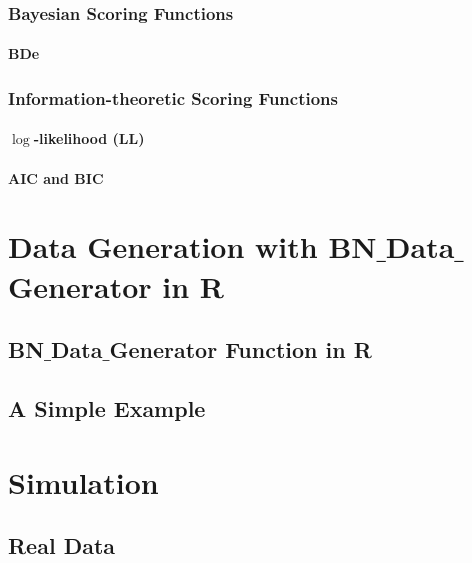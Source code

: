 \documentclass[12pt,a4paper,oneside]{book}
\theoremstyle{plain}
\theoremstyle{definition}
\theoremstyle{remark}
\theoremstyle{definition}
\numberwithin{equation}{chapter}
\begin{document}
\subsection{Bayesian Scoring Functions}


\subsubsection{BDe}


\subsection{Information-theoretic Scoring Functions}
\subsubsection{$\log$-likelihood (LL)}


\subsubsection{AIC and BIC}






\chapter{Data Generation with BN$\_$Data$\_$Generator in R}


\section{BN$\_$Data$\_$Generator Function in R}


\section{A Simple Example}






\chapter{Simulation}


\section{Real Data}
\end{document}
